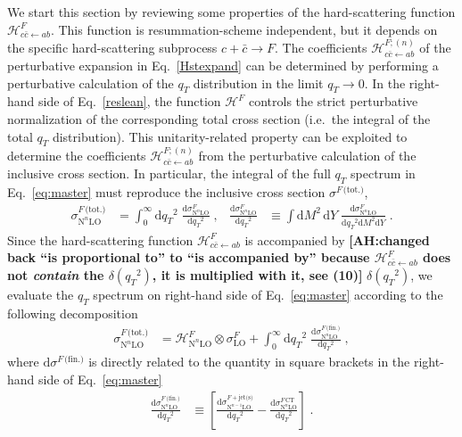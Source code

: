 \documentclass[12pt]{article}
\DeclareRobustCommand{\AH}[1]{\textbf{\quad\color{purple}[AH:\quad #1]}\xspace}
\DeclareRobustCommand{\qt}{\ensuremath{q_T}\xspace}
\DeclareRobustCommand{\rd}{\ensuremath{\mathrm{d}}}
\DeclareRobustCommand{\cH}{\ensuremath{\mathcal{H}}}
\DeclareRobustCommand{\jets}{\text{jet(s)}\xspace}
\DeclareRobustCommand{\CT}{\text{CT}\xspace}
\DeclareRobustCommand{\fin}{\text{(fin.)}\xspace}
\DeclareRobustCommand{\tot}{\text{(tot.)}\xspace}
\DeclareRobustCommand{\LO}{\text{LO}\xspace}
\DeclareRobustCommand{\N}[1]{\ensuremath{\text{N}^{#1}}} %
\begin{document}
We start this section by reviewing some properties of the hard-scattering function $\cH_{c{\bar c} \gets ab}^{F}$. 
This function is resummation-scheme independent, but it depends on the specific hard-scattering subprocess $c + {\bar c} \to F$. 
The coefficients $\cH_{c{\bar c} \gets ab}^{F;(n)}$ of the perturbative expansion in Eq.~\eqref{Hstexpand} can be determined by performing a perturbative calculation of the $\qt$ distribution in the limit $\qt \to 0$. 
In the right-hand side of Eq.~\eqref{reslean}, the function $\cH^{F}$ controls the strict perturbative normalization of the corresponding total cross section (i.e.\ the integral of the total $\qt$ distribution). 
This unitarity-related property can be exploited to determine the coefficients $\cH_{c{\bar c} \gets ab}^{F ;(n)}$ from the perturbative calculation of the inclusive cross section.  
In particular, the integral of the full $\qt$ spectrum in Eq.~\eqref{eq:master} must reproduce the inclusive cross section $\sigma^{F\,\tot}$,
\begin{align}
  \sigma^{F\,\tot}_{\N{n}\LO}
  &=
  \int_0^\infty\rd\qt^2 \; \frac{\rd\sigma^{F}_{\N{n}\LO}}{\rd\qt^2} \;, 
  &
  \frac{\rd\sigma^{F}_{\N{n}\LO}}{\rd\qt^2}
  &\equiv
  \int\rd M^2 \, \rd Y \;
  \frac{\rd\sigma^{F}_{\N{n}\LO}}{\rd\qt^2\rd M^2\rd Y} \;.
  \label{restotp}
\end{align}
Since the hard-scattering function $\cH_{c\bar{c}\gets ab}^{F}$ is accompanied by \AH{changed back ``is proportional to'' to ``is accompanied by'' because $\cH_{c\bar{c}\gets ab}^{F}$ does not \emph{contain} the $\delta(\qt^{2})$, it is multiplied with it, see (10)} $\delta(\qt^{2})$, we evaluate the $\qt$ spectrum on right-hand side of Eq.~\eqref{eq:master} according to the following decomposition \cite{Bozzi:2005wk}
\begin{align}
  \sigma^{F\,\tot}_{\N{n}\LO}
  &=
  \cH^F_{\N{n}\LO} \otimes \sigma^F_{\LO} + 
  \int_0^\infty\rd\qt^2 \; \frac{\rd\sigma^{F\,\fin}_{\N{n}\LO}}{\rd\qt^2} \;, 
  \label{sigtotrel} 
\end{align}
where $\rd{\sigma}^{F\,\fin}$ is directly related to the quantity in square brackets in the right-hand side of Eq.~\eqref{eq:master}
\begin{align}
  \frac{\rd\sigma^{F\,\fin}_{\N{n}\LO}}{\rd\qt^2}
  &\equiv
  \left[
    \frac{\rd\sigma^{F+\jets}_{\N{n-1}\LO}}{\rd\qt^2} -
    \frac{\rd\sigma^{F\,\CT}_{\N{n}\LO}}{\rd\qt^2} 
  \right]
  \; .
  \label{sigfin}
\end{align}
\end{document}
